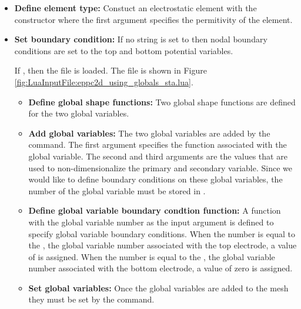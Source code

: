 \begin{itemize}

  \item{\textbf{Define element type:}}
  Constuct an electrostatic element with the constructor
   where the first 
  argument specifies the permitivity of the element.

  \item{\textbf{Set boundary condition:}}
  If no string is set to  then
  nodal boundary conditions are set to the top and bottom
  potential variables. 

  If , then
  the file  is loaded.
  The file is shown in Figure 
  \ref{fig:LuaInputFile:eppc2d_using_globals_sta.lua}.
  \begin{itemize}

     \item{\textbf{Define global shape functions:}}
     Two global shape functions are defined for the two global
     variables.

     \item{\textbf{Add global variables:}}
     The two global variables are added by the  
     command. The first argument specifies the function associated with 
     the global variable. The second and third arguments are 
     the values that are used to non-dimensionalize the primary
     and secondary variable. Since we would like to define
     boundary conditions on these global variables, the number of
     the global variable must be stored in . 

     \item{\textbf{Define global variable boundary condtion function:}}
     A function with the global variable number as the input 
     argument is defined to specify global variable boundary 
     conditions. When the number  is equal to the 
     , the global variable number associated with the top
     electrode, a value of  is assigned. 
     When the number  is equal to the 
     , the global variable number associated with the 
     bottom electrode, a value of zero is assigned. 

     \item{\textbf{Set global variables:}}
     Once the global variables are added to the mesh they must
     be set by the  command. 


\end{itemize}
\end{itemize}
